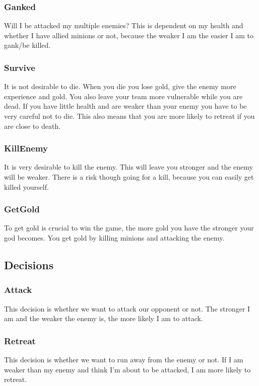 \documentclass[titlepage]{article}
\begin{document}
\subsubsection*{Ganked}
Will I be attacked my multiple enemies? This is dependent on my health and whether I have allied minions or not, because the weaker I am the easier I am to gank/be killed.

\subsubsection*{Survive}
It is not desirable to die. When you die you lose gold, give the enemy more experience and gold. You also leave your team more vulnerable while you are dead. If you have little health and are weaker than your enemy you have to be very careful not to die. This also means that you are more likely to retreat if you are close to death.

\subsubsection*{KillEnemy}
It is very desirable to kill the enemy. This will leave you stronger and the enemy will be weaker. There is a risk though going for a kill, because you can easily get killed yourself.

\subsubsection*{GetGold}
To get gold is crucial to win the game, the more gold you have the stronger your god becomes. You get gold by killing minions and attacking the enemy.


\subsection{Decisions}

\subsubsection*{Attack}
This decision is whether we want to attack our opponent or not. The stronger I am and the weaker the enemy is, the more likely I am to attack.

\subsubsection*{Retreat}
This decision is whether we want to run away from the enemy or not. If I am weaker than my enemy and think I'm about to be attacked, I am more likely to retreat.
\end{document}
